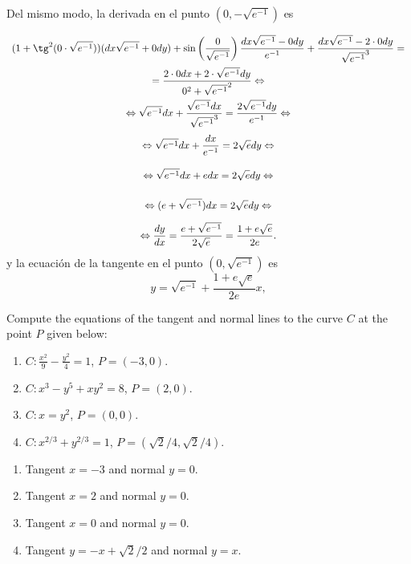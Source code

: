 {Del mismo modo, la derivada en el punto $(0,-\sqrt{e^{-1}})$ es
\[
\renewcommand{\arraystretch}{2.5}
\begin{array}{c} \displaystyle
(1+\tg^2(0\cdot \sqrt{e^{-1}}))(dx\sqrt{e^{-1}}+0dy)+\sin\left(\frac{0}{\sqrt{e^{-1}}}\right)\frac{dx\sqrt{e^{-1}}-0dy}{e^{-1}}+\frac{dx\sqrt{e^{-1}}-2\cdot 0dy}{\sqrt{e^{-1}}^3}= \\ \displaystyle
= \frac{2\cdot 0dx+2\cdot\sqrt{e^{-1}}dy}{0^2+\sqrt{e^{-1}}^2} \Leftrightarrow\\ \displaystyle
\Leftrightarrow \sqrt{e^{-1}}dx+\frac{\sqrt{e^{-1}}dx}{\sqrt{e^{-1}}^3} =
\frac{2\sqrt{e^{-1}}dy}{e^{-1}} \Leftrightarrow\\ \displaystyle
\Leftrightarrow \sqrt{e^{-1}}dx+\frac{dx}{e^{-1}} =
2\sqrt{e}dy \Leftrightarrow\\ \displaystyle
\Leftrightarrow \sqrt{e^{-1}}dx+edx = 2\sqrt{e}dy \Leftrightarrow\\ \displaystyle
\Leftrightarrow (e+\sqrt{e^{-1}})dx = 2\sqrt{e}dy \Leftrightarrow\\ \displaystyle
\Leftrightarrow \frac{dy}{dx} = \frac{e+\sqrt{e^{-1}}}{2\sqrt{e}} = \frac{1+e\sqrt{e}}{2e}.
\end{array}
\]
y la ecuación de la tangente en el punto  $(0,\sqrt{e^{-1}})$ es
\[
y = \sqrt{e^{-1}} + \frac{1+e\sqrt{e}}{2e} x,
\]
}


{Compute the equations of the tangent and normal lines to the curve $C$ at the point $P$ given below:
\begin{enumerate}
\item $\displaystyle C:\frac{x^2}{9}-\frac{y^2}{4}=1$, $P=(-3,0)$.
\item $C:x^3-y^5+xy^2 = 8$, $P=(2,0)$.
\item $C:x=y^2$, $P=(0,0)$.
\item $C:x^{2/3}+y^{2/3}=1$, $P=(\sqrt2/4,\sqrt2/4)$.
\end{enumerate}
}
{\begin{enumerate}
\item Tangent $x=-3$ and normal $y=0$.
\item Tangent $x=2$ and normal $y=0$.
\item Tangent $x=0$ and normal $y=0$.
\item Tangent $y=-x+\sqrt{2}/2$ and normal $y=x$.
\end{enumerate}
}
{
}


